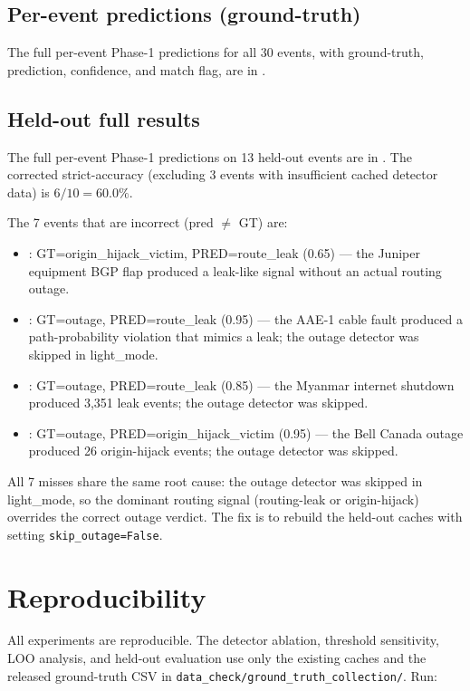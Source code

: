 \documentclass[sigcomm,nonatbib]{acmart}
\begin{document}
\subsection{Per-event predictions (ground-truth)}
\label{supp:per-event-}

The full per-event Phase-1 predictions for all 30 events,
with ground-truth, prediction, confidence, and match flag, are in
.

\subsection{Held-out full results}
\label{supp:held-out-heldout-full}

The full per-event Phase-1 predictions on 13 held-out
events are in .
The corrected strict-accuracy (excluding 3 events with
insufficient cached detector data) is $6/10 = 60.0\%$.

The 7 events that are incorrect (pred $\neq$ GT) are:
\begin{itemize}
 \item :
 GT=origin_hijack_victim, PRED=route_leak (0.65) ---
 the Juniper equipment BGP flap produced a leak-like
 signal without an actual routing outage.
 \item :
 GT=outage, PRED=route_leak (0.95) --- the AAE-1 cable
 fault produced a path-probability violation that
 mimics a leak; the outage detector was skipped in
 light_mode.
 \item :
 GT=outage, PRED=route_leak (0.85) --- the Myanmar
 internet shutdown produced 3,351 leak events; the
 outage detector was skipped.
 \item :
 GT=outage, PRED=origin_hijack_victim (0.95) ---
 the Bell Canada outage produced 26 origin-hijack
 events; the outage detector was skipped.
\end{itemize}
All 7 misses share the same root cause: the outage detector
was skipped in light_mode, so the dominant routing signal
(routing-leak or origin-hijack) overrides the correct
outage verdict. The fix is to rebuild the held-out caches with
setting \texttt{skip\_outage=False}.

\section{Reproducibility}
\label{supp:reproduce}

All experiments are reproducible. The detector ablation,
threshold sensitivity, LOO analysis, and held-out evaluation
use only the existing caches and
the released ground-truth CSV
in \texttt{data\_check/ground\_truth\_collection/}.
Run:
\end{document}
